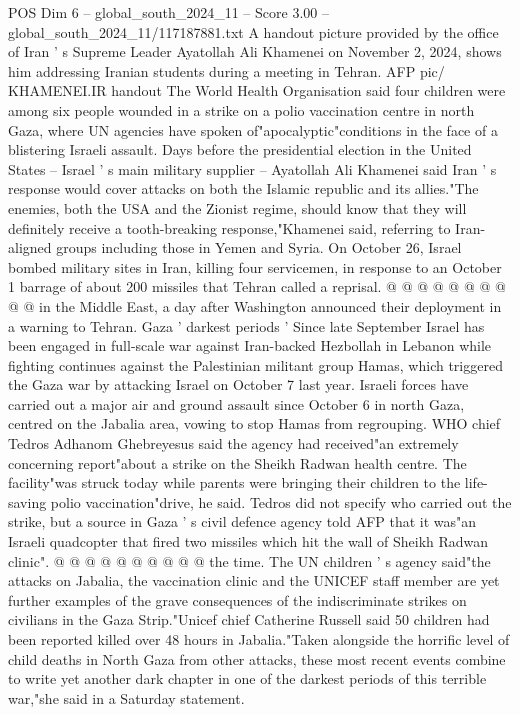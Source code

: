 \begin{textsample}{POS Dim 6 – global\_south\_2024\_11 – Score 3.00 – global\_south\_2024\_11/117187881.txt}  \label{ex:f6_pos_393}
A handout picture provided by the office of Iran ' s Supreme Leader Ayatollah Ali Khamenei on November 2, 2024, shows him addressing Iranian students during a meeting in Tehran.
AFP pic/ KHAMENEI.IR handout The World Health Organisation said four children were among six people wounded in a strike on a polio vaccination centre in north Gaza, where UN agencies have spoken of"apocalyptic"conditions in the face of a blistering Israeli assault.
Days before the presidential election in the United States -- Israel ' s main military supplier -- Ayatollah Ali Khamenei said Iran ' s response would cover attacks on both the Islamic republic and its allies."The enemies, both the USA and the Zionist regime, should know that they will definitely receive a tooth-breaking response,"Khamenei said, referring to Iran-aligned groups including those in Yemen and Syria.
On October 26, Israel bombed military sites in Iran, killing four servicemen, in response to an October 1 barrage of about 200 missiles that Tehran called a reprisal. @ @ @ @ @ @ @ @ @ @ in the Middle East, a day after Washington announced their deployment in a warning to Tehran.
Gaza ' darkest periods ' Since late September Israel has been engaged in full-scale war against Iran-backed Hezbollah in Lebanon while fighting continues against the Palestinian militant group Hamas, which triggered the Gaza war by attacking Israel on October 7 last year.
Israeli forces have carried out a major air and ground assault since October 6 in north Gaza, centred on the Jabalia area, vowing to stop Hamas from regrouping.
WHO chief Tedros Adhanom Ghebreyesus said the agency had received"an extremely concerning report"about a strike on the Sheikh Radwan health centre.
The facility"was struck today while parents were bringing their children to the life-saving polio vaccination"drive, he said.
Tedros did not specify who carried out the strike, but a source in Gaza ' s civil defence agency told AFP that it was"an Israeli quadcopter that fired two missiles which hit the wall of Sheikh Radwan clinic". @ @ @ @ @ @ @ @ @ @ the time.
The UN children ' s agency said"the attacks on Jabalia, the vaccination clinic and the UNICEF staff member are yet further examples of the grave consequences of the indiscriminate strikes on civilians in the Gaza Strip."Unicef chief Catherine Russell said 50 children had been reported killed over 48 hours in Jabalia."Taken alongside the horrific level of child deaths in North Gaza from other attacks, these most recent events combine to write yet another dark chapter in one of the darkest periods of this terrible war,"she said in a Saturday statement.

\end{textsample}
